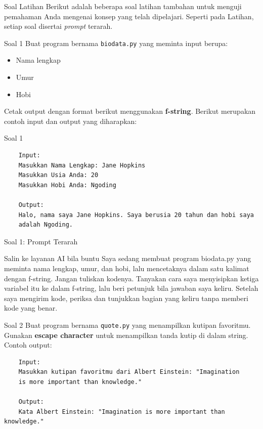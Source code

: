\documentclass[aspectratio=169, table]{beamer}
\begin{document}
\begin{frame}[fragile]{Soal Latihan}
	Berikut adalah beberapa soal latihan tambahan untuk menguji pemahaman Anda mengenai konsep yang telah dipelajari. Seperti pada Latihan, setiap soal disertai \textit{prompt} terarah.
\end{frame}

\begin{frame}{Soal 1}
	Buat program bernama \texttt{biodata.py} yang meminta input berupa:
	\begin{itemize}
		\item Nama lengkap
		\item Umur
		\item Hobi
	\end{itemize}
	Cetak output dengan format berikut menggunakan \textbf{f-string}. Berikut merupakan contoh input dan output yang diharapkan:
\end{frame}

\begin{frame}[fragile]{Soal 1}
	\begin{verbatim}
	Input:
	Masukkan Nama Lengkap: Jane Hopkins
	Masukkan Usia Anda: 20
	Masukkan Hobi Anda: Ngoding

	Output:
	Halo, nama saya Jane Hopkins. Saya berusia 20 tahun dan hobi saya 
	adalah Ngoding.
	\end{verbatim}
\end{frame}

\begin{frame}{Soal 1: Prompt Terarah}
\begin{block}{Salin ke layanan AI bila buntu}
\small Saya sedang membuat program biodata.py yang meminta nama lengkap, umur, dan hobi, lalu mencetaknya dalam satu kalimat dengan f-string. Jangan tuliskan kodenya. Tanyakan cara saya menyisipkan ketiga variabel itu ke dalam f-string, lalu beri petunjuk bila jawaban saya keliru. Setelah saya mengirim kode, periksa dan tunjukkan bagian yang keliru tanpa memberi kode yang benar.
\end{block}
\end{frame}

\begin{frame}[fragile]{Soal 2}
\small
	Buat program bernama \texttt{quote.py} yang menampilkan kutipan favoritmu. Gunakan \textbf{escape character} untuk menampilkan tanda kutip di dalam string. Contoh output:

	\begin{verbatim}
	Input:
	Masukkan kutipan favoritmu dari Albert Einstein: "Imagination 
	is more important than knowledge."

	Output:
	Kata Albert Einstein: "Imagination is more important than knowledge."
	\end{verbatim}
\end{frame}
\end{document}
